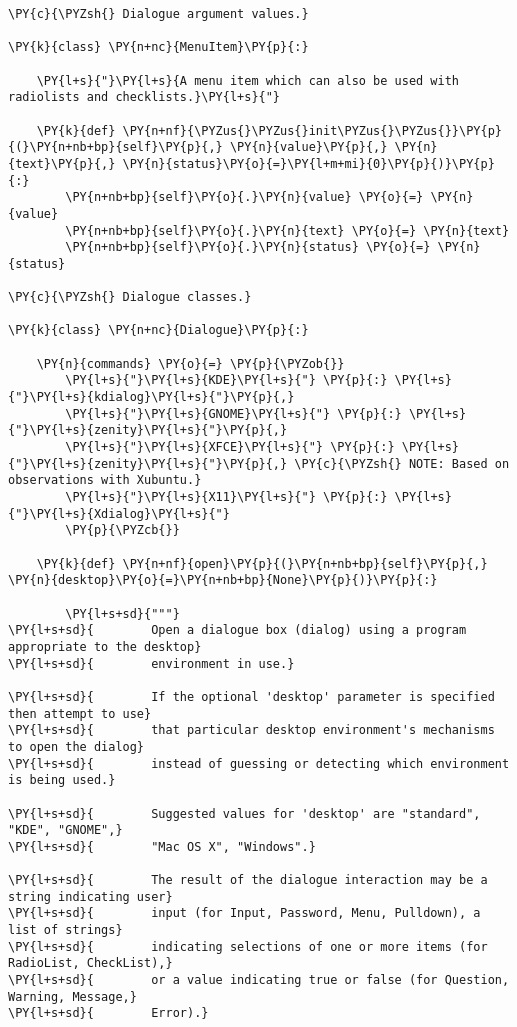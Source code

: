 \begin{Verbatim}[commandchars=\\\{\}]
\PY{c}{\PYZsh{} Dialogue argument values.}

\PY{k}{class} \PY{n+nc}{MenuItem}\PY{p}{:}

    \PY{l+s}{"}\PY{l+s}{A menu item which can also be used with radiolists and checklists.}\PY{l+s}{"}

    \PY{k}{def} \PY{n+nf}{\PYZus{}\PYZus{}init\PYZus{}\PYZus{}}\PY{p}{(}\PY{n+nb+bp}{self}\PY{p}{,} \PY{n}{value}\PY{p}{,} \PY{n}{text}\PY{p}{,} \PY{n}{status}\PY{o}{=}\PY{l+m+mi}{0}\PY{p}{)}\PY{p}{:}
        \PY{n+nb+bp}{self}\PY{o}{.}\PY{n}{value} \PY{o}{=} \PY{n}{value}
        \PY{n+nb+bp}{self}\PY{o}{.}\PY{n}{text} \PY{o}{=} \PY{n}{text}
        \PY{n+nb+bp}{self}\PY{o}{.}\PY{n}{status} \PY{o}{=} \PY{n}{status}

\PY{c}{\PYZsh{} Dialogue classes.}

\PY{k}{class} \PY{n+nc}{Dialogue}\PY{p}{:}

    \PY{n}{commands} \PY{o}{=} \PY{p}{\PYZob{}}
        \PY{l+s}{"}\PY{l+s}{KDE}\PY{l+s}{"} \PY{p}{:} \PY{l+s}{"}\PY{l+s}{kdialog}\PY{l+s}{"}\PY{p}{,}
        \PY{l+s}{"}\PY{l+s}{GNOME}\PY{l+s}{"} \PY{p}{:} \PY{l+s}{"}\PY{l+s}{zenity}\PY{l+s}{"}\PY{p}{,}
        \PY{l+s}{"}\PY{l+s}{XFCE}\PY{l+s}{"} \PY{p}{:} \PY{l+s}{"}\PY{l+s}{zenity}\PY{l+s}{"}\PY{p}{,} \PY{c}{\PYZsh{} NOTE: Based on observations with Xubuntu.}
        \PY{l+s}{"}\PY{l+s}{X11}\PY{l+s}{"} \PY{p}{:} \PY{l+s}{"}\PY{l+s}{Xdialog}\PY{l+s}{"}
        \PY{p}{\PYZcb{}}

    \PY{k}{def} \PY{n+nf}{open}\PY{p}{(}\PY{n+nb+bp}{self}\PY{p}{,} \PY{n}{desktop}\PY{o}{=}\PY{n+nb+bp}{None}\PY{p}{)}\PY{p}{:}

        \PY{l+s+sd}{"""}
\PY{l+s+sd}{        Open a dialogue box (dialog) using a program appropriate to the desktop}
\PY{l+s+sd}{        environment in use.}

\PY{l+s+sd}{        If the optional 'desktop' parameter is specified then attempt to use}
\PY{l+s+sd}{        that particular desktop environment's mechanisms to open the dialog}
\PY{l+s+sd}{        instead of guessing or detecting which environment is being used.}

\PY{l+s+sd}{        Suggested values for 'desktop' are "standard", "KDE", "GNOME",}
\PY{l+s+sd}{        "Mac OS X", "Windows".}

\PY{l+s+sd}{        The result of the dialogue interaction may be a string indicating user}
\PY{l+s+sd}{        input (for Input, Password, Menu, Pulldown), a list of strings}
\PY{l+s+sd}{        indicating selections of one or more items (for RadioList, CheckList),}
\PY{l+s+sd}{        or a value indicating true or false (for Question, Warning, Message,}
\PY{l+s+sd}{        Error).}


\end{Verbatim}

